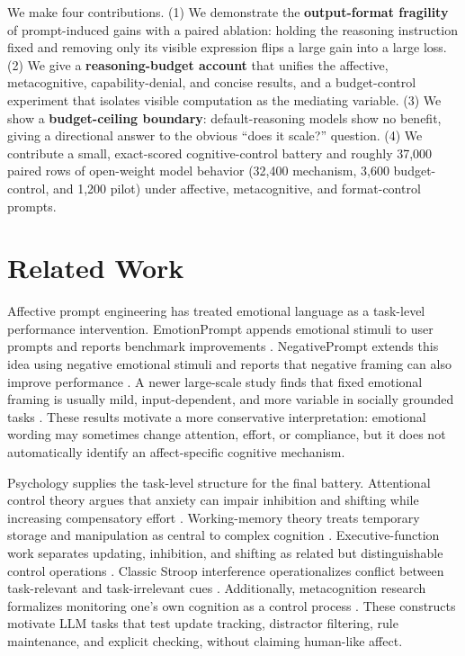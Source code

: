 \documentclass{article}
\begin{document}
We make four contributions. (1) We demonstrate the \textbf{output-format fragility} of prompt-induced gains with a paired ablation: holding the reasoning instruction fixed and removing only its visible expression flips a large gain into a large loss. (2) We give a \textbf{reasoning-budget account} that unifies the affective, metacognitive, capability-denial, and concise results, and a budget-control experiment that isolates visible computation as the mediating variable. (3) We show a \textbf{budget-ceiling boundary}: default-reasoning models show no benefit, giving a directional answer to the obvious ``does it scale?'' question. (4) We contribute a small, exact-scored cognitive-control battery and roughly 37,000 paired rows of open-weight model behavior (32,400 mechanism, 3,600 budget-control, and 1,200 pilot) under affective, metacognitive, and format-control prompts.

\section{Related Work}

Affective prompt engineering has treated emotional language as a task-level performance intervention. EmotionPrompt appends emotional stimuli to user prompts and reports benchmark improvements \citep{li2023emotionprompt}. NegativePrompt extends this idea using negative emotional stimuli and reports that negative framing can also improve performance \citep{wang2024negativeprompt}. A newer large-scale study finds that fixed emotional framing is usually mild, input-dependent, and more variable in socially grounded tasks \citep{zhao2026emotions}. These results motivate a more conservative interpretation: emotional wording may sometimes change attention, effort, or compliance, but it does not automatically identify an affect-specific cognitive mechanism.

Psychology supplies the task-level structure for the final battery. Attentional control theory argues that anxiety can impair inhibition and shifting while increasing compensatory effort \citep{eysenck2007anxiety}. Working-memory theory treats temporary storage and manipulation as central to complex cognition \citep{baddeley1992working}. Executive-function work separates updating, inhibition, and shifting as related but distinguishable control operations \citep{miyake2000unity}. Classic Stroop interference operationalizes conflict between task-relevant and task-irrelevant cues \citep{stroop1935studies}. Additionally, metacognition research formalizes monitoring one's own cognition as a control process \citep{flavell1979metacognition}. These constructs motivate LLM tasks that test update tracking, distractor filtering, rule maintenance, and explicit checking, without claiming human-like affect.
\end{document}
